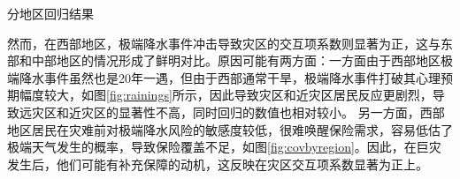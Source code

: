 \begin{table}
    \centering
    \caption{分地区回归结果}\label{tab:het_geo}
    
\end{table}

然而，在西部地区，极端降水事件冲击导致灾区的交互项系数则显著为正，这与东部和中部地区的情况形成了鲜明对比。原因可能有两方面：一方面由于西部地区极端降水事件虽然也是20年一遇，但由于西部通常干旱，极端降水事件打破其心理预期幅度较大，如图\ref{fig:rainings}所示，因此导致灾区和近灾区居民反应更剧烈，导致远灾区和近灾区的显著性不高，同时回归的数值也相对较小。
另一方面，西部地区居民在灾难前对极端降水风险的敏感度较低，很难唤醒保险需求，容易低估了极端天气发生的概率\citep{tversky1973availability}，导致保险覆盖不足，如图\ref{fig:covbyregion}。因此，在巨灾发生后，他们可能有补充保障的动机，这反映在灾区交互项系数显著为正上。

